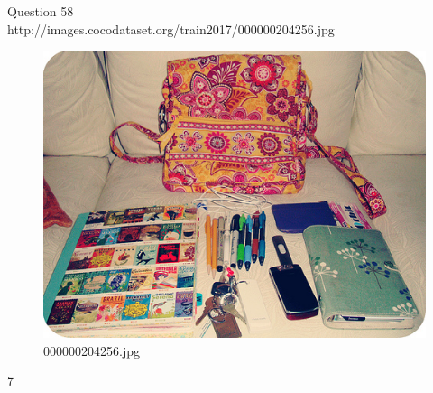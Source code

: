 Question 58\\
http://images.cocodataset.org/train2017/000000204256.jpg
\begin{figure}[h]
    \centering
    \includegraphics[width=0.8\linewidth]{../image set/hard/000000204256.jpg}
    \caption{000000204256.jpg}
\end{figure}7
